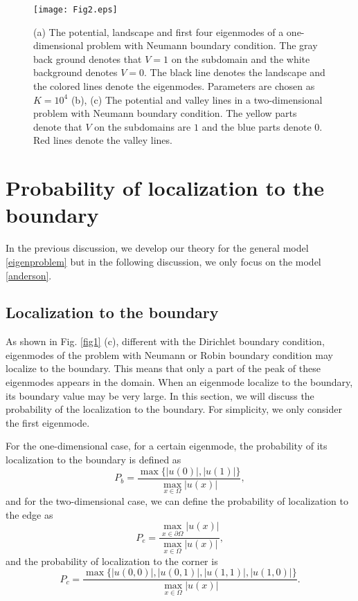 \documentclass[a4paper,11pt]{article}
\begin{document}
\begin{figure}
\centering
\texttt{[image: Fig2.eps]}
\caption{(a) The potential, landscape and first four eigenmodes of a one-dimensional problem with Neumann boundary condition. The gray back ground denotes that $V = 1$ on the subdomain and the white background denotes $V = 0$. The black line denotes the landscape and the colored lines denote the eigenmodes. Parameters are chosen as $K = 10^4$ (b), (c) The potential and valley lines in a two-dimensional problem with Neumann boundary condition. The yellow parts denote that $V$ on the subdomains are $1$ and the blue parts denote $0$. Red lines denote the valley lines.}
\label{fig2}
\end{figure}

\section{Probability of localization to the boundary}\label{prob}

In the previous discussion, we develop our theory for the general model \eqref{eigenproblem} but in the following discussion, we only focus on the model \eqref{anderson}.

\subsection{Localization to the boundary}

As shown in Fig. \ref{fig1} (c), different with the Dirichlet boundary condition, eigenmodes of the problem with Neumann or Robin boundary condition may localize to the boundary. This means that only a part of the peak of these eigenmodes appears in the domain. When an eigenmode localize to the boundary, its boundary value may be very large. In this section, we will discuss the probability of the localization to the boundary. For simplicity, we only consider the first eigenmode.

For the one-dimensional case, for a certain eigenmode, the probability of its localization to the boundary is defined as
\begin{equation}
P_b = \frac{\max\{|u(0)|, |u(1)|\}}{\max_{x \in \Omega} |u(x)|},
\end{equation}
and for the two-dimensional case, we can define the probability of localization to the edge as
\begin{equation}
P_e = \frac{\max_{x \in \partial \Omega} |u(x)|}{\max_{x \in \Omega} |u(x)|},
\end{equation}
and the probability of localization to the corner is
\begin{equation}
P_c = \frac{\max\{|u(0,0)|, |u(0,1)|, |u(1,1)|, |u(1,0)|\}}{\max_{x \in \Omega} |u(x)|}.
\end{equation}
\end{document}
